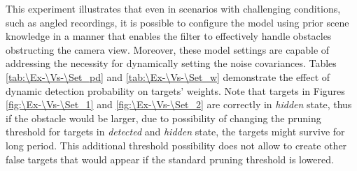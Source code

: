 This experiment illustrates that even in scenarios with challenging conditions, such as angled recordings, it is
possible to configure the model using prior scene knowledge in a manner that enables the filter to effectively handle
obstacles obstructing the camera view.
Moreover, these model settings are capable of addressing the necessity for dynamically setting the noise covariances.
Tables \ref{tab:\Ex-\Vs-\Set_pd} and \ref{tab:\Ex-\Vs-\Set_w} demonstrate the effect of dynamic detection probability on targets' weights.
Note that targets
in Figures \ref{fig:\Ex-\Vs-\Set_1} and \ref{fig:\Ex-\Vs-\Set_2} are correctly in \textit{hidden} state, thus if the
obstacle would be larger, due to possibility of changing the pruning threshold for targets in \textit{detected} and \textit{hidden} state, the targets might survive for long period. This additional threshold possibility does not allow to create other false targets that would appear if the standard pruning threshold is lowered.